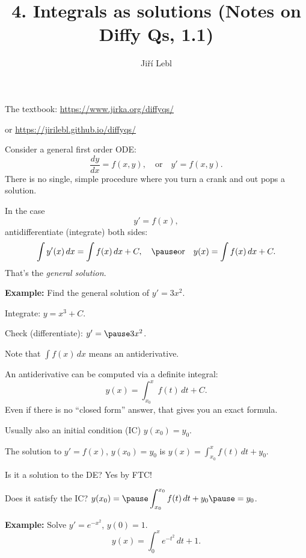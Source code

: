 \documentclass[10pt,aspectratio=169]{beamer}
\author{Ji\v{r}\'i Lebl}
\institute[OSU]{%
Oklahoma State University%
}
\title{4. Integrals as solutions (Notes on Diffy Qs, 1.1)}
\date{}
\begin{document}
\begin{frame}
\titlepage


\begin{center}
The textbook: \url{https://www.jirka.org/diffyqs/}

or \url{https://jirilebl.github.io/diffyqs/}
\end{center}
\end{frame}

\begin{frame}
Consider a general first order ODE:
\[
\frac{dy}{dx} = f(x,y) ,
\quad\text{or}\quad
y' = f(x,y) .
\]
\pause
There is no single, simple procedure where you turn a crank and out pops a
solution.

\medskip
\pause

In the case
\[
y' = f(x) ,
\]
\pause
antidifferentiate (integrate) both sides:
\[
\int y'(x) \,dx = \int f(x) \,dx + C ,
\quad\pause\text{or}\quad
y(x) = \int f(x) \,dx + C .
\]
\pause
That's the \emph{general solution}.

\medskip
\pause

\textbf{Example:}
Find the general solution of $y' = 3 x^2$.

\medskip
\pause

Integrate:\quad
$y = x^3 + C$.

\medskip
\pause

Check (differentiate):\quad
$y' = \pause 3x^2$.
\quad
{\Large\checkmark}
\end{frame}

\begin{frame}
Note that $\int f(x) \, dx$ means an antiderivative.

\medskip
\pause

An antiderivative can be computed via a definite integral:
\[
y(x) = \int_{x_0}^x f(t) \,dt + C .
\]
\pause
Even if there is no ``closed form'' answer, that gives you
an exact formula.

\medskip
\pause

Usually also an initial condition (IC) \quad $y(x_0) = y_0$.

\medskip
\pause

The solution to $y' = f(x)$, $y(x_0)=y_0$ is
\quad
$\displaystyle
y(x) = \int_{x_0}^x f(t) \,dt + y_0$.

\medskip
\pause

Is it a solution to the DE?
\pause
Yes by FTC!

\medskip
\pause

Does it satisfy the IC?
\quad
\pause
$\displaystyle y(x_0) = \pause \int_{x_0}^{x_0} f(t)\,dt + y_0 \pause = y_0$.
\quad
{\Large\checkmark}

\medskip
\pause

\textbf{Example:}
Solve
$y' = e^{-x^2}$, $y(0) = 1$.
\pause
\[
y(x) = \int_0^x e^{-t^2} \,dt + 1 .
\]
\end{frame}
\end{document}
